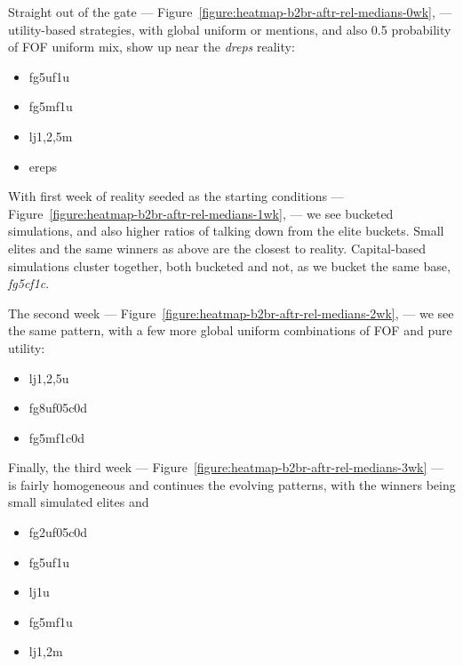 \documentclass[10pt,oneside]{memoir}
\begin{document}
Straight out of the gate --- Figure~\ref{figure:heatmap-b2br-aftr-rel-medians-0wk}, --- utility-based strategies, with global uniform or mentions, and also 0.5 probability of FOF uniform mix, show up near the {\itshape dreps} reality:


\begin{itemize}


\item fg5uf1u

\item fg5mf1u

\item lj{1,2,5}m

\item ereps
\end{itemize}

With first week of reality seeded as the starting conditions --- Figure~\ref{figure:heatmap-b2br-aftr-rel-medians-1wk}, --- we see bucketed simulations, and also higher ratios of talking down from the elite buckets.  Small elites and the same winners as above are the closest to reality.   Capital-based simulations cluster together, both bucketed and not, as we bucket the same base, {\itshape fg5cf1c}.


The second week --- Figure~\ref{figure:heatmap-b2br-aftr-rel-medians-2wk}, --- we see the same pattern, with a few more global uniform combinations of FOF and pure utility:


\begin{itemize}


\item lj{1,2,5}u

\item fg8uf05c0d

\item fg5mf1c0d
\end{itemize}

Finally, the third week --- Figure~\ref{figure:heatmap-b2br-aftr-rel-medians-3wk} --- is fairly homogeneous and continues the evolving patterns, with the winners being small simulated elites and


\begin{itemize}


\item fg2uf05c0d

\item fg5uf1u

\item lj1u

\item fg5mf1u

\item lj{1,2}m
\end{itemize}
\end{document}
